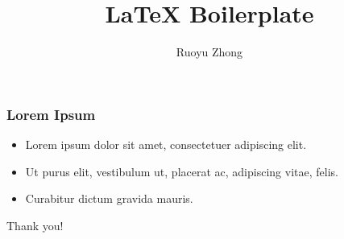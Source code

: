 \documentclass[aspectratio=169]{beamer}
\title{LaTeX Boilerplate}
\author{Ruoyu Zhong}
\date{}
\begin{document}
\begin{frame}
  \titlepage
\end{frame}

\begin{frame}
  \frametitle{Lorem Ipsum}
  \begin{itemize}
    \item Lorem ipsum dolor sit amet, consectetuer adipiscing elit.
      \pause
    \item Ut purus elit, vestibulum ut, placerat ac, adipiscing vitae, felis.
      \pause
    \item Curabitur dictum gravida mauris.
  \end{itemize}
\end{frame}

\begin{frame}[standout]
  Thank you!
\end{frame}
\end{document}
